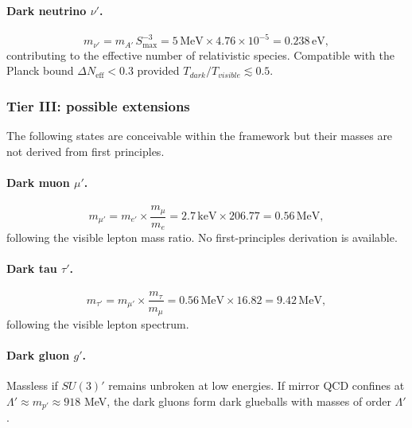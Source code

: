 \documentclass[a4paper,1pt,oneside,openany]{book}
\begin{document}
\paragraph{Dark neutrino \texorpdfstring{$\nu'$}{nu'}.}
\begin{equation}
m_{\nu'}
=
m_{A'}\,S_{\max}^{-3}
=
5\,\text{MeV}\times 4.76\times 10^{-5}
=
0.238\,\text{eV},
\label{eq:mnu'-tier2}
\end{equation}
contributing to the effective number of relativistic species. 
Compatible with the Planck bound $\Delta N_{\text{eff}}<0.3$ 
provided $T_{dark}/T_{visible}\lesssim 0.5$.

\subsubsection{Tier III: possible extensions}

The following states are conceivable within the framework but 
their masses are not derived from first principles.

\paragraph{Dark muon \texorpdfstring{$\mu'$}{mu'}.}
\begin{equation}
m_{\mu'}
=
m_{e'}\times\frac{m_{\mu}}{m_{e}}
=
2.7\,\text{keV}\times 206.77
=
0.56\,\text{MeV},
\label{eq:mmu'-tier3}
\end{equation}
following the visible lepton mass ratio. No first-principles 
derivation is available.

\paragraph{Dark tau \texorpdfstring{$\tau'$}{tau'}.}
\begin{equation}
m_{\tau'}
=
m_{\mu'}\times\frac{m_{\tau}}{m_{\mu}}
=
0.56\,\text{MeV}\times 16.82
=
9.42\,\text{MeV},
\label{eq:mtau'-tier3}
\end{equation}
following the visible lepton spectrum.

\paragraph{Dark gluon \texorpdfstring{$g'$}{g'}.}
Massless if $SU(3)'$ remains unbroken at low energies. If mirror 
QCD confines at $\Lambda'\approx m_{p'}\approx 918$ MeV, the dark 
gluons form dark glueballs with masses of order $\Lambda'$.
\end{document}
